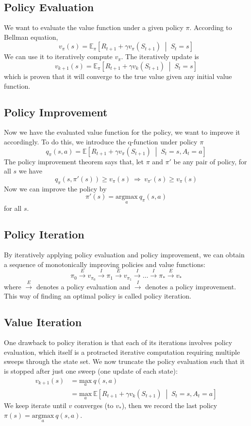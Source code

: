 \documentclass[balance,upint,subscriptcorrection,varvw,mathalfa=cal=boondoxo,pdf-a,colorlinks,nofoot]{asmeconf}
\begin{document}
\subsection{Policy Evaluation}
\noindent We want to evaluate the value function under a given policy \(\pi\).
According to Bellman equation,
\[v_\pi(s)=\mathbb{E}_\pi\left[R_{t+1}+\gamma v_\pi(S_{t+1})\;\middle|\;
S_t=s\right]\]
We can use it to iteratively compute \(v_\pi\). The iteratively update is
\[v_{k+1}(s)=\mathbb{E}_\pi\left[R_{t+1}+\gamma v_k(S_{t+1})\;\middle|\;
S_t=s\right]\]
which is proven that it will converge to the true value given any initial value 
function.

\subsection{Policy Improvement}
\noindent Now we have the evaluated value function for the policy, we want to 
improve it accordingly. To do this, we introduce the q-function under 
policy \(\pi\)
\[q_\pi(s, a) = \mathbb{E}\left[R_{t+1} + \gamma v_\pi(S_{t+1})\;\middle|\;
S_t=s, A_t=a\right]\]
The policy improvement theorem says that, let \(\pi\) and \(\pi'\) be any pair
of policy, for all \(s\) we have
\[q_\pi(s, \pi'(s))\geq v_\pi(s) \:\Rightarrow\: v_{\pi'}(s) \geq v_\pi(s)\]
Now we can improve the policy by
\[\pi'(s)=\underset{a}{\text{argmax}}\:q_\pi(s,a)\]
for all \(s\).

\subsection{Policy Iteration}
\noindent By iteratively applying policy evaluation and policy improvement, we
can obtain a sequence of monotonically improving policies and value functions:
\[\pi_0 \overset{E}{\longrightarrow} v_{\pi_0} \overset{I}{\longrightarrow}
\pi_1 \overset{E}{\longrightarrow} v_{\pi_1} \overset{I}{\longrightarrow}
\dots \overset{I}{\longrightarrow} \pi_* \overset{E}{\longrightarrow} v_*\]
where \(\overset{E}{\longrightarrow}\) denotes a policy evaluation and
\(\overset{I}{\longrightarrow}\) denotes a policy improvement. This way of 
finding an optimal policy is called policy iteration.

\subsection{Value Iteration}
\noindent One drawback to policy iteration is that each of its iterations 
involves policy evaluation, which itself is a protracted iterative computation
requiring multiple sweeps through the state set.
\vspace{3mm}\newline We now truncate the policy evaluation such that it is
stopped after just one sweep (one update of each state):
\begin{align*}
    v_{k+1}(s)&=\underset{a}{\text{max}}\:q(s, a)\\
              &=\underset{a}{\text{max}}\:\mathbb{E}\left[
          R_{t+1}+\gamma v_k(S_{t+1})\;\middle|\;S_t=s, A_t=a\right]
\end{align*}
We keep iterate until \(v\) converges (to \(v_*\)), then we record the last
policy \(\pi(s) = \underset{a}{\text{argmax}}\:q(s, a)\).
\end{document}
